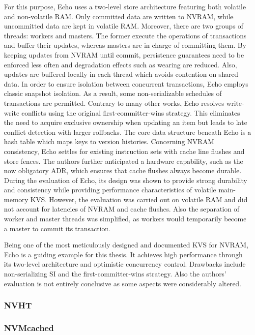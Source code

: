For this purpose, Echo uses a two-level store architecture featuring both
volatile and non-volatile RAM. Only committed data are written to NVRAM, while
uncommitted data are kept in volatile RAM. Moreover, there are two groups of
threads: workers and masters. The former execute the operations of transactions
and buffer their updates, whereas masters are in charge of committing them. By
keeping updates from NVRAM until commit, persistence guarantees need to be
enforced less often and degradation effects such as wearing are reduced. Also,
updates are buffered locally in each thread which avoids contention on shared
data. In order to ensure isolation between concurrent transactions, Echo employs
classic snapshot isolation. As a result, some non-serializable schedules of
transactions are permitted. Contrary to many other works, Echo resolves
write-write conflicts using the original first-committer-wins strategy. This
eliminates the need to acquire exclusive ownership when updating an item but
leads to late conflict detection with larger rollbacks. The core data structure
beneath Echo is a hash table which maps keys to version histories. Concerning
NVRAM consistency, Echo settles for existing instruction sets with cache line
flushes and store fences. The authors further anticipated a hardware capability,
such as the now obligatory ADR, which ensures that cache flushes always become
durable. During the evaluation of Echo, its design was shown to provide strong
durability and consistency while providing performance characteristics of
volatile main-memory KVS. However, the evaluation was carried out on volatile
RAM and did not account for latencies of NVRAM and cache flushes. Also the
separation of worker and master threads was simplified, as workers would
temporarily become a master to commit its transaction.

Being one of the most meticulously designed and documented KVS for NVRAM, Echo
is a guiding example for this thesis. It achieves high performance through its
two-level architecture and optimistic concurrency control. Drawbacks include
non-serializing SI and the first-committer-wins strategy. Also the authors'
evaluation is not entirely conclusive as some aspects were considerably altered.

\subsubsection{NVHT}
\subsubsection{NVMcached}
